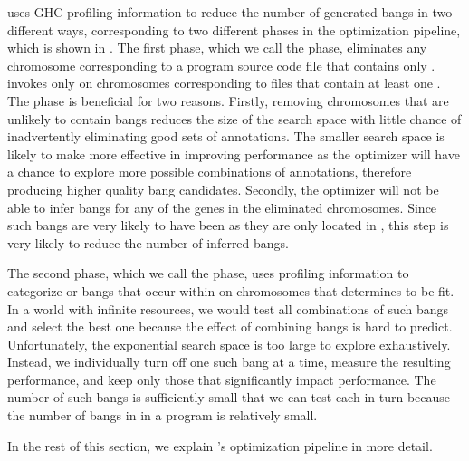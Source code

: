 \At{} uses GHC profiling information to reduce the
number of generated bangs in two different ways, corresponding to two
different phases in the optimization pipeline, which is shown in . 
The first phase, which we call the \Preopt{} phase, eliminates
any chromosome corresponding to a program source code file that
contains only \coldspots{}. \At{} invokes \Ao{} only on chromosomes
corresponding to files that contain at least one \hotspot{}. The \preopt{}
phase is beneficial for two reasons. Firstly, removing
chromosomes that are unlikely to contain \useful{} bangs reduces the
size of the search space with little chance of inadvertently
eliminating good sets of annotations. The smaller search space is
likely to make \Ao{} more effective in improving performance as the 
optimizer will have a chance to explore more possible combinations
of annotations, therefore producing higher quality bang candidates. 
Secondly, the optimizer will not be able to
infer bangs for any of the genes in the eliminated chromosomes.  
Since such bangs are very likely to have been \useless{} as they
are only located in \coldspots{}, this step is very likely to 
reduce the number of inferred \useless{} bangs.

The second phase, which we call the \Postopt{} phase, uses profiling
information to categorize \useless{} or \useful{} bangs that occur within \hotspots{} on
chromosomes that \Ao{} determines to be fit. In a world with infinite resources,
we would test all combinations of such bangs and select the best one
because the effect of combining bangs is hard to predict.
Unfortunately, the exponential search space is too large to explore
exhaustively. Instead, we individually turn off one such bang at a
time, measure the resulting performance, and keep only those that
significantly impact performance.  The number of such bangs is
sufficiently small that we can test each in turn because the number of
bangs in \hotspots{} in a program is relatively small.

In the rest of this section, we explain \At{}'s optimization pipeline
in more detail.

